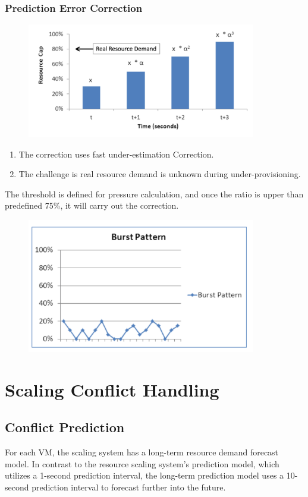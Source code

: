 \documentclass[acmlarge]{acmart}
\begin{document}
\subsubsection{Prediction Error Correction}
\begin{figure}[H]
  \centering
  \includegraphics[width=10cm]{./error_correction.png}
\end{figure}
\begin{enumerate}
  \item The correction uses fast under-estimation Correction.
  \item The challenge is real resource demand is unknown during under-provisioning.
\end{enumerate}
The threshold is defined for pressure calculation, and once the ratio is upper than predefined 75\%, it will carry out the correction.
\begin{figure}[H]
  \centering
  \includegraphics[width=10cm]{./burst.png}
\end{figure}

\section{Scaling Conflict Handling}
\subsection{Conflict Prediction}
For each VM, the scaling system has a long-term resource demand forecast model. In contrast to the resource scaling system's prediction model, which utilizes a 1-second prediction interval, the long-term prediction model uses a 10-second prediction interval to forecast further into the future.
\end{document}
